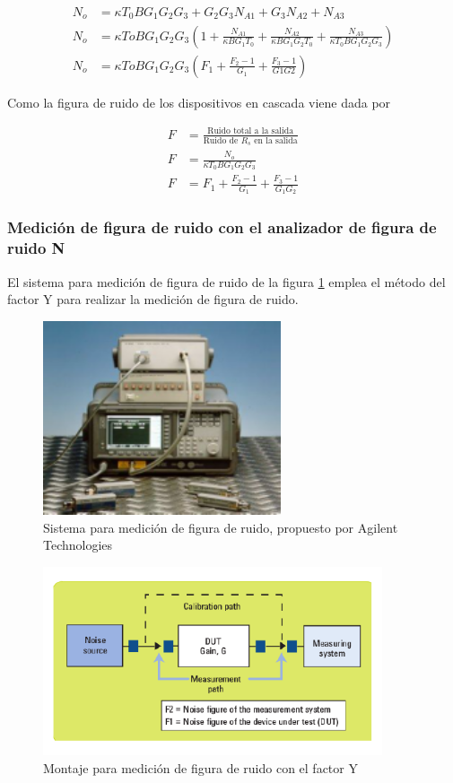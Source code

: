 \documentclass{article}
\begin{document}
	\begin{align}
		N_o &= {\kappa}T_0BG_1G_2G_3 + G_2G_3N_{A1} + G_3N_{A2}+N_{A3} \\
		N_o &= {\kappa}ToBG_1G_2G_3(1 + \frac{N_{A1}}{{\kappa}BG_1T_0}  + \frac{N_{A2}}{{\kappa}BG_1G_2T_0}+\frac{N_{A3}}{{\kappa}T_0BG_1G_2G_3}) \\	
		N_o &= {\kappa}ToBG_1G_2G_3(F_1 + \frac{F_2 - 1}{G_1} + \frac{F_3 - 1}{G1G2})
	\end{align}
	
	Como la figura de ruido de los dispositivos en cascada viene dada por
	
	\begin{align} 
		F &= \frac{\text{Ruido total a la salida}}{\text{Ruido de $R_s$ en la salida}} \\
		F &= \frac{N_o}{{\kappa}T_0BG_1G_2G_3} \\
		F &= F_1 + \frac{F_2 - 1}{G_1} + \frac{F_3 - 1}{G_1G_2}		
	\end{align} 		
	
	\subsubsection{Medición de figura de ruido con el analizador de figura de ruido N}
	
	El sistema para medición de figura de ruido de la figura \ref{Fig:SistemaMedicionFiguraRuido} emplea el método del factor Y para realizar la medición de figura de ruido.
	
	\begin{figure}[h!]
		\centering
		\includegraphics[width=7cm]{Imagenes/BancoPruebasFuenteRuido.png}
		\caption{Sistema para medición de figura de ruido, propuesto por Agilent Technologies}
		\label{Fig:SistemaMedicionFiguraRuido}
	\end{figure}
	
	\begin{figure}[h!]
		\centering
		\includegraphics[width=10cm]{Imagenes/InstrumentacionFactorY.pdf}
		\caption{Montaje para medición de figura de ruido con el factor Y}
	\end{figure}
	
\end{document}
